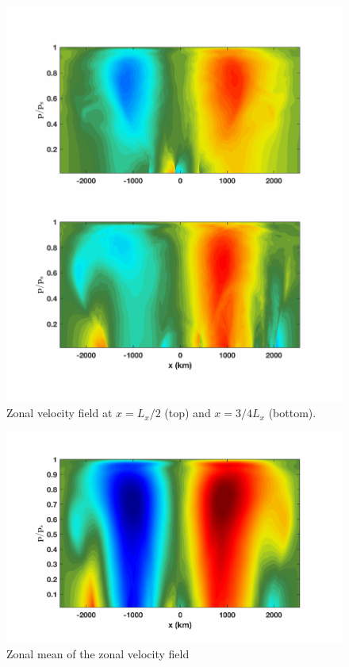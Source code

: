 \begin{figure}[H]
\vspace{-2em}
\includegraphics[scale=1]{Chapter3/img/U_2_Day11}
\caption{Zonal velocity field at $x = L_x/2$ (top) and $x = 3/4 L_x$ (bottom).}
\label{fig:U_2_Day11}
\end{figure}

\begin{figure}[H]
\vspace{-2em}
\includegraphics[scale=1]{Chapter3/img/U_avg_Day11}
\caption{Zonal mean of the zonal velocity field}
\label{fig:U_avg_Day11}
\end{figure}

